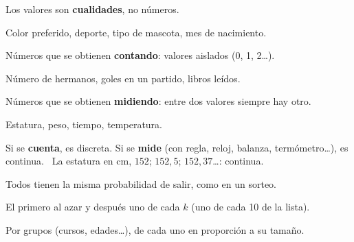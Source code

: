 \documentclass[11pt,a4paper]{article}
\begin{document}
\vfill
\begin{tcbraster}[raster columns=3,raster equal height,raster column skip=8pt]
\begin{tcolorbox}[fmbase,colback=fmA!8,colframe=fmA,coltitle=white,title={Cualitativa}]
Los valores son \textbf{cualidades}, no números.\par\smallskip
\small Color preferido, deporte, tipo de mascota, mes de nacimiento.
\end{tcolorbox}
\begin{tcolorbox}[fmbase,colback=fmB!8,colframe=fmB,coltitle=white,title={Cuantitativa discreta}]
Números que se obtienen \textbf{contando}: valores aislados (0, 1, 2\dots).\par\smallskip
\small Número de hermanos, goles en un partido, libros leídos.
\end{tcolorbox}
\begin{tcolorbox}[fmbase,colback=fmK!8,colframe=fmK,coltitle=white,title={Cuantitativa continua}]
Números que se obtienen \textbf{midiendo}: entre dos valores siempre hay otro.\par\smallskip
\small Estatura, peso, tiempo, temperatura.
\end{tcolorbox}
\end{tcbraster}

\vfill
\begin{truc}
Si se \textbf{cuenta}, es discreta. Si se \textbf{mide} (con regla, reloj, balanza, termómetro\dots), es continua. \ La estatura en cm, $152$; $152{,}5$; $152{,}37$\dots: continua.
\end{truc}

\vfill
\begin{tcbraster}[raster columns=3,raster equal height,raster column skip=8pt]
\begin{tcolorbox}[fmbase,colback=fmdefbg,colframe=fmdef,coltitle=white,title={\faRandom\ \ Aleatorio simple}]
\small Todos tienen la misma probabilidad de salir, como en un sorteo.
\end{tcolorbox}
\begin{tcolorbox}[fmbase,colback=fmdefbg,colframe=fmdef,coltitle=white,title={\faListOl\ \ Sistemático}]
\small El primero al azar y después uno de cada $k$ (uno de cada 10 de la lista).
\end{tcolorbox}
\begin{tcolorbox}[fmbase,colback=fmdefbg,colframe=fmdef,coltitle=white,title={\faLayerGroup\ \ Estratificado}]
\small Por grupos (cursos, edades\dots), de cada uno en proporción a su tamaño.
\end{tcolorbox}
\end{tcbraster}
\end{document}
